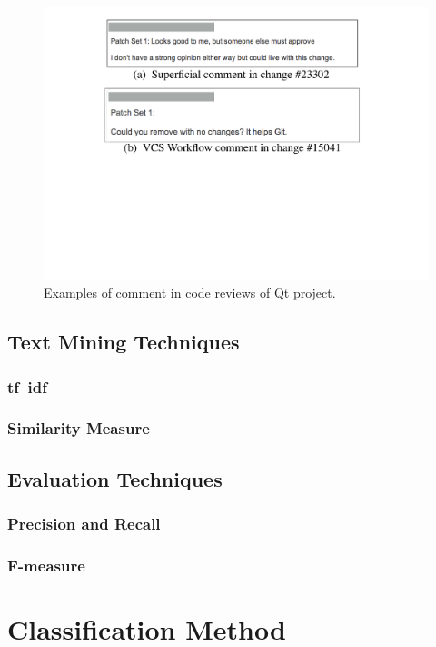 \documentclass[conference]{IEEEtran}
\begin{document}
\begin{figure}[!t]
\centering
\includegraphics[scale=0.4, trim= 100 250 0 0, clip=true]{comment_examples}
\caption{Examples of comment in code reviews of Qt project.}
\label{fig:example}
\end{figure}

\subsection{Text Mining Techniques}
\subsubsection{tf--idf}
\subsubsection{Similarity Measure}
\subsection{Evaluation Techniques}
\subsubsection{Precision and Recall}
\subsubsection{F-measure}



\section{Classification Method}
\end{document}
